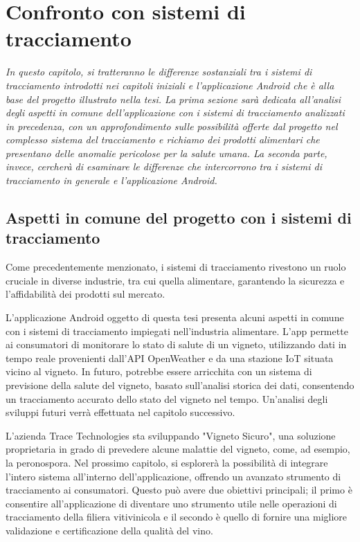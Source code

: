 \chapter{Confronto con sistemi di tracciamento}

\begin{preamble}
{\em
In questo capitolo, si tratteranno le differenze sostanziali tra i sistemi di tracciamento introdotti nei capitoli iniziali e l'applicazione Android che è alla base del progetto illustrato nella tesi. \newline \indent La prima sezione sarà dedicata all'analisi degli aspetti in comune dell'applicazione con i sistemi di tracciamento analizzati in precedenza, con un approfondimento sulle possibilità offerte dal progetto nel complesso sistema del tracciamento e richiamo dei prodotti alimentari che presentano delle anomalie pericolose per la salute umana. \newline \indent La seconda parte, invece, cercherà di esaminare le differenze che intercorrono tra i sistemi di tracciamento in generale e l'applicazione Android.
}
\end{preamble}

\section{Aspetti in comune del progetto con i sistemi di tracciamento}

Come precedentemente menzionato, i sistemi di tracciamento rivestono un ruolo cruciale in diverse industrie, tra cui quella alimentare, garantendo la sicurezza e l'affidabilità dei prodotti sul mercato.

L'applicazione Android oggetto di questa tesi presenta alcuni aspetti in comune con i sistemi di tracciamento impiegati nell'industria alimentare. L'app permette ai consumatori di monitorare lo stato di salute di un vigneto, utilizzando dati in tempo reale provenienti dall'API OpenWeather e da una stazione IoT situata vicino al vigneto. In futuro, potrebbe essere arricchita con un sistema di previsione della salute del vigneto, basato sull'analisi storica dei dati, consentendo un tracciamento accurato dello stato del vigneto nel tempo. Un'analisi degli sviluppi futuri verrà effettuata nel capitolo successivo.

L'azienda Trace Technologies sta sviluppando "Vigneto Sicuro", una soluzione proprietaria in grado di prevedere alcune malattie del vigneto, come, ad esempio, la peronospora. Nel prossimo capitolo, si esplorerà la possibilità di integrare l'intero sistema all'interno dell'applicazione, offrendo un avanzato strumento di tracciamento ai consumatori. Questo può avere due obiettivi principali; il primo è consentire all'applicazione di diventare uno strumento utile nelle operazioni di tracciamento della filiera vitivinicola e il secondo è quello di fornire una migliore validazione e certificazione della qualità del vino.

